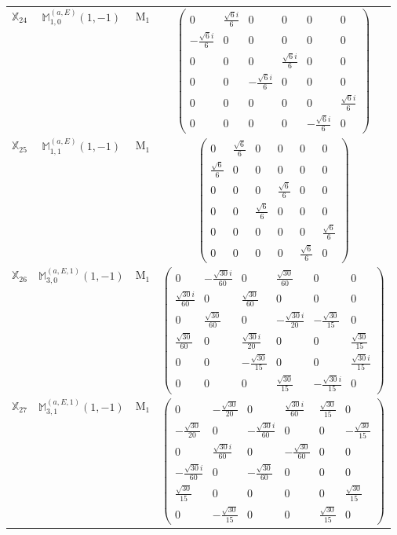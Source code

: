 \documentclass[fleqn,10pt,landscape]{article}
\begin{document}
\begin{itemize}
\begin{center}
\begin{longtable}{c|c|c|c}
$ \mathbb{X}_{24} $ & $\mathbb{M}_{1,0}^{(a,E)}(1,-1)$ & M$_{1}$ & $\begin{pmatrix} 0 & \frac{\sqrt{6} i}{6} & 0 & 0 & 0 & 0 \\ - \frac{\sqrt{6} i}{6} & 0 & 0 & 0 & 0 & 0 \\ 0 & 0 & 0 & \frac{\sqrt{6} i}{6} & 0 & 0 \\ 0 & 0 & - \frac{\sqrt{6} i}{6} & 0 & 0 & 0 \\ 0 & 0 & 0 & 0 & 0 & \frac{\sqrt{6} i}{6} \\ 0 & 0 & 0 & 0 & - \frac{\sqrt{6} i}{6} & 0 \end{pmatrix}$ \\
$ \mathbb{X}_{25} $ & $\mathbb{M}_{1,1}^{(a,E)}(1,-1)$ & M$_{1}$ & $\begin{pmatrix} 0 & \frac{\sqrt{6}}{6} & 0 & 0 & 0 & 0 \\ \frac{\sqrt{6}}{6} & 0 & 0 & 0 & 0 & 0 \\ 0 & 0 & 0 & \frac{\sqrt{6}}{6} & 0 & 0 \\ 0 & 0 & \frac{\sqrt{6}}{6} & 0 & 0 & 0 \\ 0 & 0 & 0 & 0 & 0 & \frac{\sqrt{6}}{6} \\ 0 & 0 & 0 & 0 & \frac{\sqrt{6}}{6} & 0 \end{pmatrix}$ \\
$ \mathbb{X}_{26} $ & $\mathbb{M}_{3,0}^{(a,E,1)}(1,-1)$ & M$_{1}$ & $\begin{pmatrix} 0 & - \frac{\sqrt{30} i}{60} & 0 & \frac{\sqrt{30}}{60} & 0 & 0 \\ \frac{\sqrt{30} i}{60} & 0 & \frac{\sqrt{30}}{60} & 0 & 0 & 0 \\ 0 & \frac{\sqrt{30}}{60} & 0 & - \frac{\sqrt{30} i}{20} & - \frac{\sqrt{30}}{15} & 0 \\ \frac{\sqrt{30}}{60} & 0 & \frac{\sqrt{30} i}{20} & 0 & 0 & \frac{\sqrt{30}}{15} \\ 0 & 0 & - \frac{\sqrt{30}}{15} & 0 & 0 & \frac{\sqrt{30} i}{15} \\ 0 & 0 & 0 & \frac{\sqrt{30}}{15} & - \frac{\sqrt{30} i}{15} & 0 \end{pmatrix}$ \\
$ \mathbb{X}_{27} $ & $\mathbb{M}_{3,1}^{(a,E,1)}(1,-1)$ & M$_{1}$ & $\begin{pmatrix} 0 & - \frac{\sqrt{30}}{20} & 0 & \frac{\sqrt{30} i}{60} & \frac{\sqrt{30}}{15} & 0 \\ - \frac{\sqrt{30}}{20} & 0 & - \frac{\sqrt{30} i}{60} & 0 & 0 & - \frac{\sqrt{30}}{15} \\ 0 & \frac{\sqrt{30} i}{60} & 0 & - \frac{\sqrt{30}}{60} & 0 & 0 \\ - \frac{\sqrt{30} i}{60} & 0 & - \frac{\sqrt{30}}{60} & 0 & 0 & 0 \\ \frac{\sqrt{30}}{15} & 0 & 0 & 0 & 0 & \frac{\sqrt{30}}{15} \\ 0 & - \frac{\sqrt{30}}{15} & 0 & 0 & \frac{\sqrt{30}}{15} & 0 \end{pmatrix}$ \\

\end{longtable}
\end{center}
\end{itemize}
\end{document}
